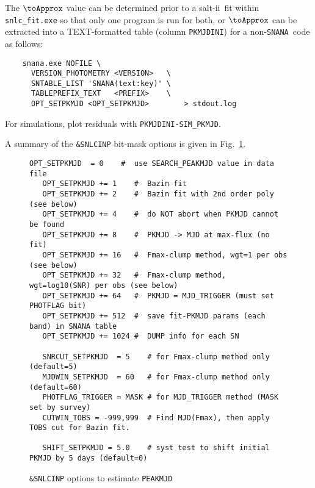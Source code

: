 \documentclass[12pt]{article}
\newcommand{\SALTII}{{\sc salt-ii}}
\newcommand{\SNANA}{{\tt SNANA}}
\begin{document}
The $\toApprox$ value can be determined prior to a \SALTII\ fit 
within {\tt snlc\_fit.exe} so that only one program is run for both,
or $\toApprox$ can be extracted into a TEXT-formatted table
(column {\tt PKMJDINI}) for a non-\SNANA\ code as follows:
%
\begin{verbatim}
    snana.exe NOFILE \
      VERSION_PHOTOMETRY <VERSION>   \
      SNTABLE_LIST 'SNANA(text:key)' \
      TABLEPREFIX_TEXT   <PREFIX>    \  
      OPT_SETPKMJD <OPT_SETPKMJD>        > stdout.log
\end{verbatim}
%
For simulations, plot residuals with {\tt PKMJDINI-SIM\_PKMJD}.

A summary of the {\tt \&SNLCINP} bit-mask options is given in 
Fig.~\ref{fig:SETPKMJD}.
%
\begin{figure} [hb] 
\begin{center}
\caption{{\tt\&SNLCINP} options to estimate {\tt PEAKMJD}}
\label{fig:SETPKMJD}
\begin{Verbatim}[frame=single]
   OPT_SETPKMJD  = 0    #  use SEARCH_PEAKMJD value in data file
   OPT_SETPKMJD += 1    #  Bazin fit
   OPT_SETPKMJD += 2    #  Bazin fit with 2nd order poly (see below)
   OPT_SETPKMJD += 4    #  do NOT abort when PKMJD cannot be found
   OPT_SETPKMJD += 8    #  PKMJD -> MJD at max-flux (no fit)
   OPT_SETPKMJD += 16   #  Fmax-clump method, wgt=1 per obs (see below)
   OPT_SETPKMJD += 32   #  Fmax-clump method, wgt=log10(SNR) per obs (see below)
   OPT_SETPKMJD += 64   #  PKMJD = MJD_TRIGGER (must set PHOTFLAG bit)
   OPT_SETPKMJD += 512  #  save fit-PKMJD params (each band) in SNANA table
   OPT_SETPKMJD += 1024 #  DUMP info for each SN

   SNRCUT_SETPKMJD  = 5    # for Fmax-clump method only (default=5)
   MJDWIN_SETPKMJD  = 60   # for Fmax-clump method only (default=60)
   PHOTFLAG_TRIGGER = MASK # for MJD_TRIGGER method (MASK set by survey)
   CUTWIN_TOBS = -999,999  # Find MJD(Fmax), then apply TOBS cut for Bazin fit.

   SHIFT_SETPKMJD = 5.0    # syst test to shift initial PKMJD by 5 days (default=0)
\end{Verbatim}
\end{center}
\end{figure}
\end{document}
